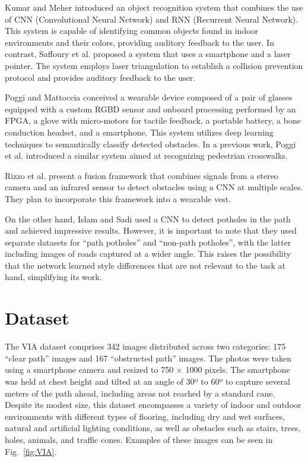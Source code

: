\documentclass[preprint,12pt]{elsarticle}
\begin{document}
Kumar and Meher \cite{kumar2015} introduced an object recognition system that combines the use of CNN (Convolutional Neural Network) and RNN (Recurrent Neural Network). This system is capable of identifying common objects found in indoor environments and their colors, providing auditory feedback to the user. In contrast, Saffoury et al. \cite{saffoury2016} proposed a system that uses a smartphone and a laser pointer. The system employs laser triangulation to establish a collision prevention protocol and provides auditory feedback to the user.

Poggi and Mattoccia \cite{poggi2016} conceived a wearable device composed of a pair of glasses equipped with a custom RGBD sensor and onboard processing performed by an FPGA, a glove with micro-motors for tactile feedback, a portable battery, a bone conduction headset, and a smartphone. This system utilizes deep learning techniques to semantically classify detected obstacles. In a previous work, Poggi et al. \cite{poggi2015} introduced a similar system aimed at recognizing pedestrian crosswalks.

Rizzo et al. \cite{rizzo2017} present a fusion framework that combines signals from a stereo camera and an infrared sensor to detect obstacles using a CNN at multiple scales. They plan to incorporate this framework into a wearable vest.

On the other hand, Islam and Sadi \cite{islam2018} used a CNN to detect potholes in the path and achieved impressive results. However, it is important to note that they used separate datasets for ``path potholes'' and ``non-path potholes'', with the latter including images of roads captured at a wider angle. This raises the possibility that the network learned style differences that are not relevant to the task at hand, simplifying its work.

\section{Dataset}\label{sec:dataset}

The VIA dataset \cite{breve2020} comprises 342 images distributed across two categories: 175 ``clear path'' images and 167 ``obstructed path'' images. The photos were taken using a smartphone camera and resized to 750 × 1000 pixels. The smartphone was held at chest height and tilted at an angle of 30º to 60º to capture several meters of the path ahead, including areas not reached by a standard cane. Despite its modest size, this dataset encompasses a variety of indoor and outdoor environments with different types of flooring, including dry and wet surfaces, natural and artificial lighting conditions, as well as obstacles such as stairs, trees, holes, animals, and traffic cones. Examples of these images can be seen in Fig.~\ref{fig:VIA}.
\end{document}
